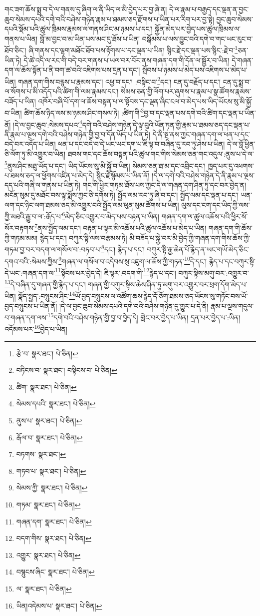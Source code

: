 གང་ཟག་ཆོས་སྨྲ་བ་དེ་ལ་གནས་དུ་ཞིག་ལ་ནི་ཡིད་ལ་མི་བྱེད་པར་བྱ་ཞེ་ན། དེ་ལ་རྣམ་པ་བརྒྱད་དང་ལྡན་ན་བྱང་ཆུབ་སེམས་དཔའི་དགེ་བའི་བཤེས་གཉེན་རྣམ་པ་ཐམས་ཅད་རྫོགས་པ་ཡིན་པར་རིག་པར་བྱ་སྟེ། བྱང་ཆུབ་སེམས་དཔའི་སྡོམ་པའི་ཚུལ་ཁྲིམས་རྣམས་ལ་གནས་ཤིང་མ་ཉམས་པ་དང་། སྐྱོན་མེད་པར་བྱེད་པས་ཚུལ་ཁྲིམས་ལ་གནས་པ་ཡིན། བློ་མ་བྱང་བ་མ་ཡིན་པས་མང་དུ་ཐོས་པ་ཡིན། བསྒོམས་པ་ལས་བྱུང་བའི་དགེ་བ་གང་ཡང་རུང་བ་ཐོབ་ཅིང་། ཞི་གནས་དང་ལྷག་མཐོང་ཐོབ་པས་རྟོགས་པ་དང་ལྡན་པ་ཡིན། སྙིང་རྗེ་དང་ལྡན་པས་སྙིང་:རྗེ་བ་\footnote{རྩེ་བ་  སྣར་ཐང་།  པེ་ཅིན། }ཅན་ཡིན་ཏེ། དེ་ཚེ་འདི་ལ་རང་གི་བདེ་བར་གནས་པ་ཡལ་བར་བོར་ནས་གཞན་དག་གི་དོན་ལ་སྦྱོར་བ་ཡིན། དེ་གཞན་དག་ལ་ཆོས་སྟོན་པ་ནི་བག་ཚ་བའི་འཇིགས་པས་དྲན་པ་དང་། སྤོབས་པ་ཉམས་པ་མེད་པས་འཇིགས་པ་མེད་པ་ཡིན། གཞན་དག་གིས་བརྙས་པ་རྣམས་དང་། འཕྱ་བ་དང་། :བསྟིང་བ་\footnote{བཏིངས་བ་  སྣར་ཐང་། བསྟིངས་བ་  པེ་ཅིན། }དང་། ངན་དུ་བརྗོད་པ་དང་། ངན་དུ་སྨྲ་བ་ལ་སོགས་པ་མི་འདོད་པའི་ཚིག་གི་ལམ་རྣམས་དང་། སེམས་ཅན་གྱི་ལོག་པར་ཞུགས་པ་རྣམ་པ་སྣ་ཚོགས་རྣམས་བཟོད་པ་ཡིན། འཁོར་བཞི་པོ་དག་ལ་ཆོས་བསྟན་པ་ལ་སྟོབས་དང་ལྡན་ཞིང་ངལ་བ་མེད་པས་ཡིད་ཡོངས་སུ་མི་སྐྱོ་བ་ཡིན། ཚིག་ཆོས་ཉིད་ལས་མ་ཉམས་ཤིང་གསལ་ཏེ། :ཚིག་གི་\footnote{ཚིག་  སྣར་ཐང་།  པེ་ཅིན། }བྱ་བ་དང་ལྡན་པས་དགེ་བའི་ཚིག་དང་ལྡན་པ་ཡིན་ནོ། །དེ་ལ་བྱང་ཆུབ་:སེམས་དཔའ་\footnote{སེམས་དཔའི་  སྣར་ཐང་།  པེ་ཅིན། }དགེ་བའི་བཤེས་གཉེན་དེ་ལྟ་བུའི་ཡོན་ཏན་གྱི་རྣམ་པ་ཐམས་ཅད་དང་ལྡན་པ་ནི་རྣམ་པ་ལྔས་དགེ་བའི་བཤེས་གཉེན་གྱི་བྱ་བ་དོན་ཡོད་པ་ཡིན་ཏེ། དེ་ནི་སྔ་ནས་ཀྱང་གཞན་དག་ལ་ཕན་པ་དང་བདེ་བར་འདོད་པ་ཡིན། ཕན་པ་དང་བདེ་བ་དེ་ཡང་ཡང་དག་པ་ཇི་ལྟ་བ་བཞིན་དུ་རབ་ཏུ་ཤེས་པ་ཡིན། དེ་ལ་བློ་ཕྱིན་ཅི་ལོག་ཏུ་མི་འགྱུར་བ་ཡིན། ཐབས་གང་དང་ཆོས་བསྟན་པའི་ཚུལ་གང་གིས་སེམས་ཅན་གང་འདུལ་:ནུས་པ་དེ་ལ་\footnote{ནུས་པ་  སྣར་ཐང་།  པེ་ཅིན། }ནུས་ཤིང་མཐུ་ཡོད་པ་དང་། ཡིད་ཡོངས་སུ་མི་སྐྱོ་བ་ཡིན། སེམས་ཅན་ཐ་མ་དང་འབྲིང་དང་། ཁྱད་པར་དུ་འཕགས་པ་ཐམས་ཅད་ལ་ཕྱོགས་འཛིན་པ་མེད་དེ། སྙིང་རྗེ་སྙོམས་པ་ཡིན་ནོ། །དེ་ལ་དགེ་བའི་བཤེས་གཉེན་དེ་ནི་རྣམ་པ་ལྔས་དད་པའི་གཞི་ལ་གནས་པ་ཡིན་ཏེ། གང་གི་ཕྱིར་གཏམ་ཐོས་པས་ཀྱང་དེ་ལ་གཞན་དག་ཤིན་ཏུ་དང་བར་བྱེད་ན། མངོན་སུམ་དུ་མཐོང་བས་ལྟ་སྨོས་ཀྱང་ཅི་དགོས་ཏེ། སྤྱོད་ལམ་རབ་ཏུ་ཞི་བ་དང་། སྤྱོད་ལམ་དང་ལྡན་པ་དང་། ཡན་ལག་དང་ཉིང་ལག་ཐམས་ཅད་མི་འགྱུར་བའི་སྤྱོད་ལམ་ཕུན་སུམ་ཚོགས་པ་ཡིན། ལུས་དང་ངག་དང་ཡིད་ཀྱི་ལས་ཀྱི་མཐའི་རྒྱུ་བ་ལ་:རྒོད་པ་\footnote{རྒོལ་བ་  སྣར་ཐང་།  པེ་ཅིན། }མེད་ཅིང་འགྱུར་བ་མེད་པས་བརྟན་པ་ཡིན། གཞན་དག་ལ་ཚུལ་འཆོས་པའི་ཕྱིར་སོ་སོར་བརྟགས་\footnote{བཏགས་  སྣར་ཐང་། }ནས་སྤྱོད་ལམ་དང་། བརྟན་པ་ལྟར་མི་འཆོས་པའི་ཚུལ་འཆོས་པ་མེད་པ་ཡིན། གཞན་དག་གི་ཆོས་ཀྱི་གཏམ་མམ། རྙེད་པ་དང་། བཀུར་སྟི་ལས་བརྩམས་ཏེ། མི་བཟོད་པ་སྐྱེ་བར་མི་བྱེད་ཀྱི་གཞན་དག་གིས་ཆོས་ཀྱི་གཏམ་བྱ་བར་བདག་ལ་གསོལ་བ་:བཏབ་པ་\footnote{གཏབ་པ་  སྣར་ཐང་།  པེ་ཅིན། }དང་། རྙེད་པ་དང་། བཀུར་སྟི་རྒྱ་ཆེན་པོ་རྙེད་ན་ཡང་གཡོ་མེད་ཅིང་དགའ་བའི་:སེམས་ཀྱིས་\footnote{སེམས་ཀྱི་  སྣར་ཐང་།  པེ་ཅིན། }གཞན་ལ་གསོལ་བ་འདེབས་སུ་འཇུག་ལ་ཆོས་ཀྱི་གཏན་\footnote{གཏམ་  སྣར་ཐང་།  པེ་ཅིན། }དེ་དང་། རྙེད་པ་དང་བཀུར་སྟི་དེ་ཡང་:གཞན་དག་ལ་\footnote{གཞན་དག་  སྣར་ཐང་།  པེ་ཅིན། }སྟོབས་པར་བྱེད་དེ། ཇི་ལྟར་:བདག་གི་\footnote{བདག་གིས་  སྣར་ཐང་།  པེ་ཅིན། }རྙེད་པ་དང་། བཀུར་སྟིས་མགུ་བར་:འགྱུར་བ་\footnote{འགྱུར་  སྣར་ཐང་།  པེ་ཅིན། }དེ་བཞིན་དུ་གཞན་གྱི་རྙེད་པ་དང་། གཞན་གྱི་བཀུར་སྟིས་ཆེས་ཤིན་ཏུ་མགུ་བར་འགྱུར་བར་ཕྲག་དོག་མེད་པ་ཡིན། སྣོད་སྤྱད་:བསྙུངས་ཤིང་\footnote{བསྙུངས་ཞིང་  སྣར་ཐང་།  པེ་ཅིན། }ཡོ་བྱད་བསྙུངས་ལ་འཚོག་ཆས་རྙེད་དོ་ཅོག་ཐམས་ཅད་ཡོངས་སུ་གཏོང་བས་ཡོ་བྱད་བསྙུངས་པ་ཡིན་ནོ། །དེ་ལ་བྱང་ཆུབ་སེམས་དཔའི་དགེ་བའི་བཤེས་གཉེན་དུ་གྱུར་པ་དེ་ནི། རྣམ་པ་ལྔས་གདུལ་བ་གཞན་དག་ལས་\footnote{ལ་  སྣར་ཐང་།  པེ་ཅིན། }དགེ་བའི་བཤེས་གཉེན་གྱི་བྱ་བ་བྱེད་དེ། གླེང་བར་བྱེད་པ་ཡིན། དྲན་པར་བྱེད་པ་:ཡིན། འདོམས་པར་\footnote{ཡིན།འདེམས་པ་  སྣར་ཐང་།  པེ་ཅིན། }བྱེད་པ་ཡིན། 